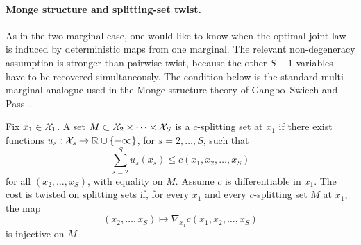 \paragraph{Monge structure and splitting-set twist.}

As in the two-marginal case, one would like to know when the optimal joint law is induced by deterministic maps from one marginal. The relevant non-degeneracy assumption is stronger than pairwise twist, because the other $S-1$ variables have to be recovered simultaneously. The condition below is the standard multi-marginal analogue used in the Monge-structure theory of Gangbo--Swiech and Pass~\cite{GangboSciech,Pass2,PassMultiMarginalStructure,PassMultiReview}.

\begin{defn}\label{def-twist-splitting-sets}
	Fix $x_1\in\mathcal{X}_1$. A set $M\subset\mathcal{X}_2\times\cdots\times\mathcal{X}_S$ is a $c$-splitting set at $x_1$ if there exist functions $u_s:\mathcal{X}_s\to\mathbb{R}\cup\{-\infty\}$, for $s=2,\ldots,S$, such that
	\[
		\sum_{s=2}^S u_s(x_s)\leq c(x_1,x_2,\ldots,x_S)
	\]
	for all $(x_2,\ldots,x_S)$, with equality on $M$. Assume $c$ is differentiable in $x_1$. The cost is twisted on splitting sets if, for every $x_1$ and every $c$-splitting set $M$ at $x_1$, the map
	\[
		(x_2,\ldots,x_S)
		\longmapsto
		\nabla_{x_1}c(x_1,x_2,\ldots,x_S)
	\]
	is injective on $M$.
\end{defn}


